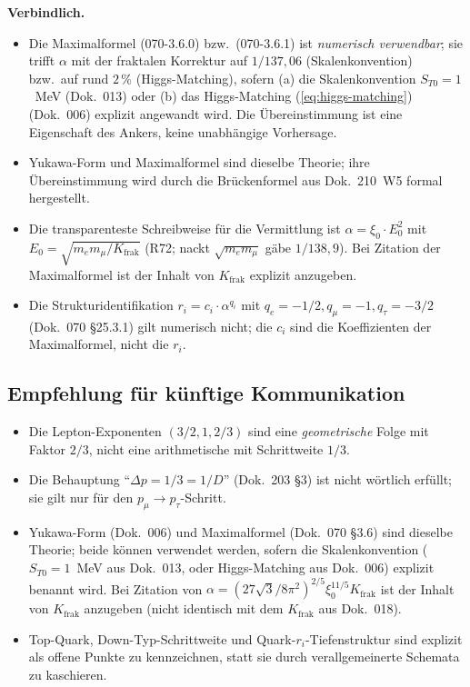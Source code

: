 \textbf{Verbindlich.}
\begin{itemize}[leftmargin=2em,itemsep=2pt,topsep=2pt]
  \item Die Maximalformel (070-3.6.0) bzw.\ (070-3.6.1) ist
        \emph{numerisch verwendbar}; sie trifft $\alpha$ mit der
        fraktalen Korrektur auf $1/137{,}06$ (Skalenkonvention) bzw.\
        auf rund $2\,\%$ (Higgs-Matching), sofern (a) die Skalenkonvention $S_{T0} = 1$~MeV (Dok.~013)
        oder (b) das Higgs-Matching (\ref{eq:higgs-matching}) (Dok.~006)
        explizit angewandt wird. Die Übereinstimmung ist eine Eigenschaft
        des Ankers, keine unabhängige Vorhersage.
  \item Yukawa-Form und Maximalformel sind dieselbe Theorie; ihre
        Übereinstimmung wird durch die Brückenformel aus Dok.~210~W5
        formal hergestellt.
  \item Die transparenteste Schreibweise für die Vermittlung ist
        $\alpha = \xi_0 \cdot E_0^2$ mit
        $E_0 = \sqrt{m_e m_\mu/K_{\text{frak}}}$ (R72; nackt $\sqrt{m_e m_\mu}$ gäbe $1/138{,}9$). Bei Zitation der Maximalformel
        ist der Inhalt von $K_{\text{frak}}$ explizit anzugeben.
  \item Die Strukturidentifikation
        $r_i = c_i \cdot \alpha^{q_i}$ mit
        $q_e = -1/2, q_\mu = -1, q_\tau = -3/2$
        (Dok.~070 §25.3.1) gilt numerisch nicht; die $c_i$ sind die
        Koeffizienten der Maximalformel, nicht die $r_i$.
\end{itemize}

\subsection{Empfehlung für künftige Kommunikation}

\begin{itemize}[leftmargin=2em,itemsep=2pt,topsep=2pt]
  \item Die Lepton-Exponenten $(3/2, 1, 2/3)$ sind eine
        \emph{geometrische} Folge mit Faktor $2/3$, nicht eine
        arithmetische mit Schrittweite $1/3$.
  \item Die Behauptung \enquote{$\Delta p = 1/3 = 1/D$}
        (Dok.~203 §3) ist nicht
        wörtlich erfüllt; sie gilt nur für den $p_\mu \to p_\tau$-Schritt.
  \item Yukawa-Form (Dok.~006) und Maximalformel (Dok.~070 §3.6)
        sind dieselbe Theorie; beide können verwendet werden, sofern
        die Skalenkonvention ($S_{T0} = 1$~MeV aus Dok.~013, oder
        Higgs-Matching aus Dok.~006) explizit benannt wird. Bei
        Zitation von $\alpha = (27\sqrt{3}/8\pi^2)^{2/5}\xi_0^{11/5}
        K_{\text{frak}}$ ist der Inhalt von $K_{\text{frak}}$
        anzugeben (nicht identisch mit dem $K_{\text{frak}}$ aus
        Dok.~018).
  \item Top-Quark, Down-Typ-Schrittweite und Quark-$r_i$-Tiefenstruktur
        sind explizit als offene Punkte zu kennzeichnen, statt sie
        durch verallgemeinerte Schemata zu kaschieren.
\end{itemize}

